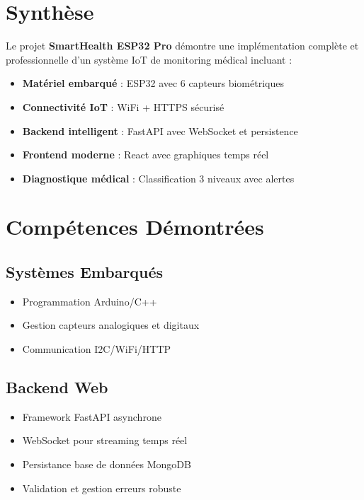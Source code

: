 \documentclass[12pt,french]{report}
\begin{document}
\section{Synthèse}

Le projet \textbf{SmartHealth ESP32 Pro} démontre une implémentation complète et professionnelle d'un système IoT de monitoring médical incluant :

\begin{itemize}
    \item \textbf{Matériel embarqué} : ESP32 avec 6 capteurs biométriques
    \item \textbf{Connectivité IoT} : WiFi + HTTPS sécurisé
    \item \textbf{Backend intelligent} : FastAPI avec WebSocket et persistence
    \item \textbf{Frontend moderne} : React avec graphiques temps réel
    \item \textbf{Diagnostique médical} : Classification 3 niveaux avec alertes
\end{itemize}

\section{Compétences Démontrées}

\subsection{Systèmes Embarqués}
\begin{itemize}
    \item Programmation Arduino/C++
    \item Gestion capteurs analogiques et digitaux
    \item Communication I2C/WiFi/HTTP
\end{itemize}

\subsection{Backend Web}
\begin{itemize}
    \item Framework FastAPI asynchrone
    \item WebSocket pour streaming temps réel
    \item Persistance base de données MongoDB
    \item Validation et gestion erreurs robuste
\end{itemize}
\end{document}
